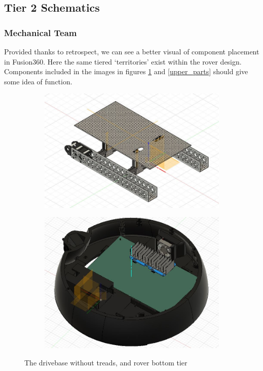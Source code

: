 \documentclass[a4paper, 10pt]{article}
\begin{document}
    \pagebreak
	\subsection{Tier 2 Schematics}
		\subsubsection{Mechanical Team}
		Provided thanks to retrospect, we can see a better visual of component placement in Fusion360. Here the same tiered `territories' exist within the rover design. Components included in the images in figures \ref{bottom_parts} and \ref{upper_parts} should give some idea of function.
		
		\begin{figure}[h]
			\centering
			\begin{subfigure}[h]{0.44\textwidth}
				\centering
				\includegraphics[width=\textwidth]{Photos/rover_drivebase}
			\end{subfigure}
			\hfill
			\begin{subfigure}[h]{0.55\textwidth}
				\centering
				\includegraphics[width=\textwidth]{Photos/rover_bottom}
			\end{subfigure}
			\centering
			\caption{The drivebase without treads, and rover bottom tier}
			\label{bottom_parts}
		\end{figure}
		
\end{document}
